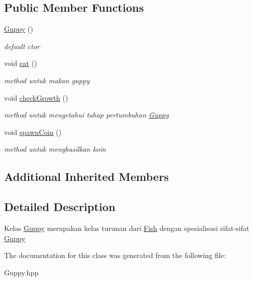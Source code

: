 \subsection*{Public Member Functions}
\begin{DoxyCompactItemize}
\item 
\mbox{\label{classGuppy_aa78f8b5323b1015c968a8edab52773f5}} 
\hyperlink{classGuppy_aa78f8b5323b1015c968a8edab52773f5}{Guppy} ()
\begin{DoxyCompactList}\small\item\em default ctor \end{DoxyCompactList}\item 
\mbox{\label{classGuppy_afe934262a0988e4ad041f4ed3a1a7e02}} 
void \hyperlink{classGuppy_afe934262a0988e4ad041f4ed3a1a7e02}{eat} ()
\begin{DoxyCompactList}\small\item\em method untuk makan guppy \end{DoxyCompactList}\item 
\mbox{\label{classGuppy_a06ceefb07ac8f6d590f8343c93c1edd9}} 
void \hyperlink{classGuppy_a06ceefb07ac8f6d590f8343c93c1edd9}{check\+Growth} ()
\begin{DoxyCompactList}\small\item\em method untuk mengetahui tahap pertumbuhan \hyperlink{classGuppy}{Guppy} \end{DoxyCompactList}\item 
\mbox{\label{classGuppy_a58d97b8704a2635e7b7a1b365c37c570}} 
void \hyperlink{classGuppy_a58d97b8704a2635e7b7a1b365c37c570}{spawn\+Coin} ()
\begin{DoxyCompactList}\small\item\em method untuk menghasilkan koin \end{DoxyCompactList}\end{DoxyCompactItemize}
\subsection*{Additional Inherited Members}


\subsection{Detailed Description}
Kelas \hyperlink{classGuppy}{Guppy} merupakan kelas turunan dari \hyperlink{classFish}{Fish} dengan spesialisasi sifat-\/sifat \hyperlink{classGuppy}{Guppy} 

The documentation for this class was generated from the following file\+:\begin{DoxyCompactItemize}
\item 
Guppy.\+hpp\end{DoxyCompactItemize}
